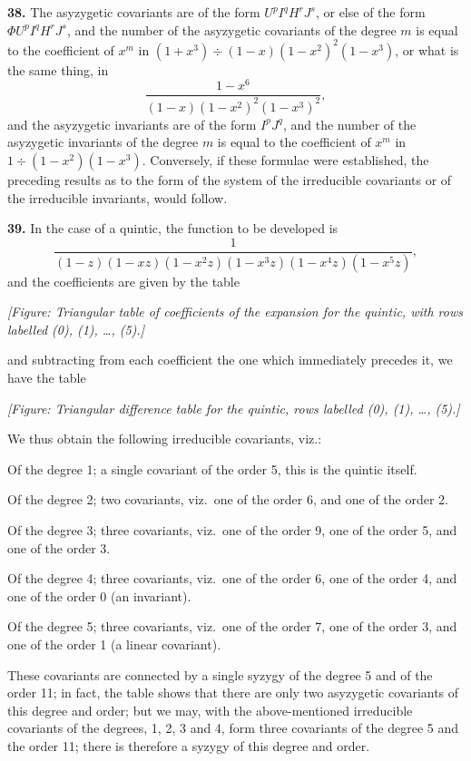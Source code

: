 \documentclass[11pt]{article}
\begin{document}
\textbf{38.} The asyzygetic covariants are of the form $U^p I^q H^r J^s$, or else of the form $\Phi U^p I^q H^r J^s$, and the number of the asyzygetic covariants of the degree $m$ is equal to the coefficient of $x^m$ in $(1 + x^3) \div (1 - x)(1 - x^2)^2(1 - x^3)$, or what is the same thing, in
\[
\frac{1 - x^6}{(1 - x)(1 - x^2)^2(1 - x^3)^2},
\]
and the asyzygetic invariants are of the form $I^p J^q$, and the number of the asyzygetic invariants of the degree $m$ is equal to the coefficient of $x^m$ in $1 \div (1 - x^2)(1 - x^3)$. Conversely, if these formulae were established, the preceding results as to the form of the system of the irreducible covariants or of the irreducible invariants, would follow.

\textbf{39.} In the case of a quintic, the function to be developed is
\[
\frac{1}{(1 - z)(1 - xz)(1 - x^2 z)(1 - x^3 z)(1 - x^4 z)(1 - x^5 z)},
\]
and the coefficients are given by the table

\textit{[Figure: Triangular table of coefficients of the expansion for the quintic, with rows labelled (0), (1), \ldots, (5).]}

and subtracting from each coefficient the one which immediately precedes it, we have the table

\textit{[Figure: Triangular difference table for the quintic, rows labelled (0), (1), \ldots, (5).]}

We thus obtain the following irreducible covariants, viz.:

Of the degree 1; a single covariant of the order 5, this is the quintic itself.

Of the degree 2; two covariants, viz.\ one of the order 6, and one of the order 2.

Of the degree 3; three covariants, viz.\ one of the order 9, one of the order 5, and one of the order 3.

Of the degree 4; three covariants, viz.\ one of the order 6, one of the order 4, and one of the order 0 (an invariant).

Of the degree 5; three covariants, viz.\ one of the order 7, one of the order 3, and one of the order 1 (a linear covariant).

These covariants are connected by a single syzygy of the degree 5 and of the order 11; in fact, the table shows that there are only two asyzygetic covariants of this degree and order; but we may, with the above-mentioned irreducible covariants of the degrees, 1, 2, 3 and 4, form three covariants of the degree 5 and the order 11; there is therefore a syzygy of this degree and order.
\end{document}
